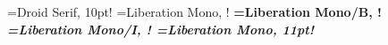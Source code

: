 
\def\monofont{\dofont Liberation Mono}
\def\seriffont{\dofont Droid Serif}

\fontsize=7.5pt
\font\headlinefont=\seriffont, 10pt!
\font\rm=\monofont, \fontsize!
\font\bf=\monofont/B, \fontsize!
\font\it=\monofont/I, \fontsize!
\font\headerfont=\monofont, 11pt!

\def\typ{\col{0 0 .5}\bf}   %
\def\com{\col{.3 .3 .3}\it} %
\def\str{\col{0 .7 0}\rm}   %
\def\dir{\col{.5 0 0}\it}   %
\def\key{\col{0 0 0}\bf}    %
\def\con{\col{.8 .1 .2}\rm} %
\def\tem{\col{.0 .2 .8}\bf} %
\def\hcol{\col{.0 .0 .0}\rm}   %

\def\docname{Tři nerdi – notebook}
